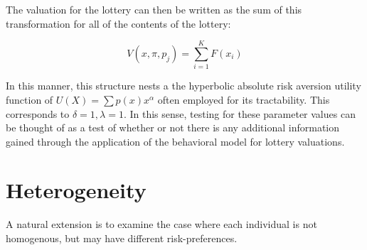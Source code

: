 \documentclass[12pt]{paper}
\newtheorem{assume}{Assumption}
\begin{document}
The valuation for the lottery can then be written as the sum of this
transformation for all of the contents of the lottery:

\begin{equation*}
  V(x,\pi,p_j) = \sum_{i=1}^K F( x_i)
\end{equation*}

In this manner, this structure nests a the hyperbolic absolute risk
aversion utility function of $U(X) = \sum p(x) x^{\alpha}$ often employed for
its tractability. This corresponds to $\delta = 1, \lambda = 1$. In this sense,
testing for these parameter values can be thought of as a test of
whether or not there is any additional information gained through the
application of the behavioral model for lottery valuations.


\section{Heterogeneity}

A natural extension is to examine the case where each individual is
not homogenous, but may have different risk-preferences. 






\end{document}
